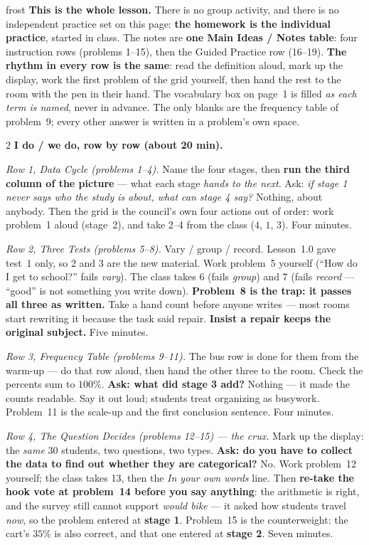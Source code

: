 \documentclass[10pt]{article}
\begin{document}
\boxguard
\begin{skillbox}{frost}
\textbf{This is the whole lesson.} There is no group activity, and there is no independent
practice set on this page: \textbf{the homework is the individual practice}, started in class.
The notes are \textbf{one Main Ideas / Notes table}: four instruction rows (problems 1--15),
then the Guided Practice row (16--19). \textbf{The rhythm in every row is the same}: read the
definition aloud, mark up the display, work the first problem of the grid yourself, then hand
the rest to the room with the pen in their hand. The vocabulary box on page~1 is filled
\emph{as each term is named}, never in advance. The only blanks are the frequency table of
problem~9; every other answer is written in a problem's own space.
\begin{multicols}{2}
\textbf{I do / we do, row by row (about 20 min).}

\emph{Row 1, Data Cycle (problems 1--4).} Name the four stages, then \textbf{run the third
column of the picture} --- what each stage \emph{hands to the next}. Ask: \emph{if stage 1
never says who the study is about, what can stage 4 say?} Nothing, about anybody. Then the
grid is the council's own four actions out of order: work problem~1 aloud (stage~2), and take
2--4 from the class ($4$, $1$, $3$). Four minutes.

\emph{Row 2, Three Tests (problems 5--8).} Vary / group / record. Lesson~1.0 gave test~1
only, so 2 and 3 are the new material. Work problem~5 yourself (``How do I get to school?''
fails \emph{vary}). The class takes 6 (fails \emph{group}) and 7 (fails \emph{record} ---
``good'' is not something you write down). \textbf{Problem~8 is the trap: it passes all three
as written.} Take a hand count before anyone writes --- most rooms start rewriting it because
the task said repair. \textbf{Insist a repair keeps the original subject.} Five minutes.

\emph{Row 3, Frequency Table (problems 9--11).} The bus row is done for them from the warm-up
--- do that row aloud, then hand the other three to the room. Check the percents sum to
$100\%$. \textbf{Ask: what did stage 3 add?} Nothing --- it made the counts readable. Say it
out loud; students treat organizing as busywork. Problem~11 is the scale-up and the first
conclusion sentence. Four minutes.

\emph{Row 4, The Question Decides (problems 12--15) --- the crux.} Mark up the display: the
\emph{same} $30$ students, two questions, two types. \textbf{Ask: do you have to collect the
data to find out whether they are categorical?} No. Work problem~12 yourself; the class takes
13, then the \emph{In your own words} line. Then \textbf{re-take the hook vote at problem~14
before you say anything}: the arithmetic is right, and the survey still cannot support
\emph{would bike} --- it asked how students travel \emph{now}, so the problem entered at
\textbf{stage 1}. Problem~15 is the counterweight: the cart's $35\%$ is also correct, and that
one entered at \textbf{stage 2}. Seven minutes.


\end{multicols}
\end{skillbox}
\end{document}

